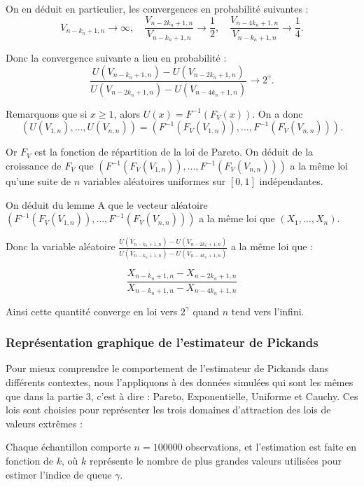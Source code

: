 \documentclass{article}
\theoremstyle{plain}
\theoremstyle{definition}
\theoremstyle{plain}
\begin{document}
On en déduit en particulier, les convergences en probabilité suivantes :
\[
V_{n-k_n+1,n}  \to \infty, \quad \frac{V_{n-2k_n+1,n}}{V_{n-k_n+1,n}} \to \frac{1}{2}, \quad \frac{V_{n-4k_n+1,n}}{V_{n-k_n+1,n}} \to \frac{1}{4}.
\]

Donc la convergence suivante a lieu en probabilité :
\[
\frac{U(V_{n-k_n+1,n}) - U(V_{n-2k_n+1,n})}{U(V_{n-2k_n+1,n}) - U(V_{n-4k_n+1,n})} \to 2^{\gamma}.
\]

Remarquons que si $x \geq 1$, alors $U(x) = F^{-1}(F_V(x))$. On a donc
\[
(U(V_{1,n}), \dots, U(V_{n,n})) = (F^{-1}(F_V(V_{1,n})), \dots, F^{-1}(F_V(V_{n,n}))).
\]

Or \(F_V\) est la fonction de répartition de la loi de Pareto. \newline
On déduit de la croissance de $F_V$ que $(F^{-1}(F_V(V_{1,n})),\dots, F^{-1}(F_V(V_{n,n})))$ a la même loi qu’une suite de $n$ variables aléatoires uniformes sur $[0,1]$ indépendantes. 

On déduit du lemme A que le vecteur aléatoire $(F^{-1}(F_V(V_{1,n})),\dots, F^{-1}(F_V(V_{n,n})))$ a la même loi que $(X_1,\dots,X_n)$. 

Donc la variable aléatoire \(\frac{U(V_{n-k_n+1,n}) - U(V_{n-2k_n+1,n})}{U(V_{n-k_n+1,n}) - U(V_{n-4k_n+1,n})}\) a la même loi que :

\[
\frac{X_{n-k_n+1,n} - X_{n-2k_n+1,n}}{X_{n-k_n+1,n} - X_{n-4k_n+1,n}}
\]

Ainsi cette quantité converge en loi vers $2^{\gamma}$ quand $n$ tend vers l’infini.

\subsubsection{Représentation graphique de l’estimateur de Pickands}

Pour mieux comprendre le comportement de l’estimateur de Pickands dans différents contextes, nous l’appliquons à des données simulées qui sont les mêmes que dans la partie 3, c'est à dire : Pareto, Exponentielle, Uniforme et Cauchy. Ces lois sont choisies pour représenter les trois domaines d’attraction des lois de valeurs extrêmes :

Chaque échantillon comporte $n = 100000$ observations, et l’estimation est faite en fonction de $k$, où \(k\) représente le nombre de plus grandes valeurs utilisées pour estimer l’indice de queue \(\gamma\).
\end{document}
